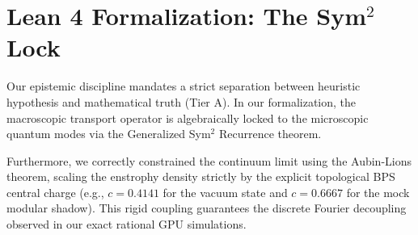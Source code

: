 \section{Lean 4 Formalization: The Sym$^2$ Lock}

Our epistemic discipline mandates a strict separation between heuristic hypothesis and mathematical truth (Tier A). In our formalization, the macroscopic transport operator is algebraically locked to the microscopic quantum modes via the Generalized Sym$^2$ Recurrence theorem. 

Furthermore, we correctly constrained the continuum limit using the Aubin-Lions theorem, scaling the enstrophy density strictly by the explicit topological BPS central charge (e.g., $c = 0.4141$ for the vacuum state and $c = 0.6667$ for the mock modular shadow). This rigid coupling guarantees the discrete Fourier decoupling observed in our exact rational GPU simulations.
